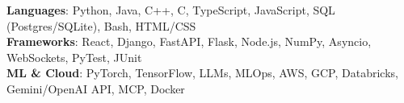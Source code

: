 \begin{itemize}[leftmargin=0.15in, label={}]
    \small{\item{
     \textbf{Languages}{: Python, Java, C++, C, TypeScript, JavaScript, SQL (Postgres/SQLite), Bash, HTML/CSS} \\
     \textbf{Frameworks}{: React, Django, FastAPI, Flask, Node.js, NumPy, Asyncio, WebSockets, PyTest, JUnit} \\
     \textbf{ML \& Cloud}{: PyTorch, TensorFlow, LLMs, MLOps, AWS, GCP, Databricks, Gemini/OpenAI API, MCP, Docker}
    }}
\end{itemize}
